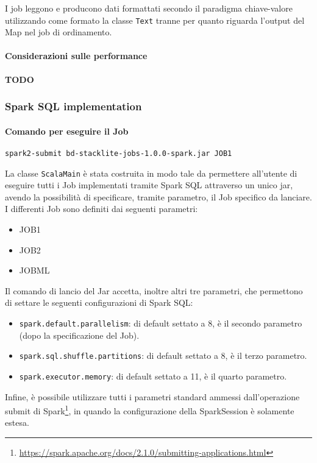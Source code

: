   I job leggono e producono dati formattati secondo il paradigma chiave-valore utilizzando come formato la classe \texttt{Text} tranne per quanto riguarda l'output del Map nel job di ordinamento.

  \paragraph{Considerazioni sulle performance}\label{par:job1:mapreduce:performance}

  \textbf{TODO}

  \subsubsection{Spark SQL implementation}\label{subsub:job1:spark}

  \paragraph{Comando per eseguire il Job}\label{par:job1:spark:cmd}

  \texttt{spark2-submit bd-stacklite-jobs-1.0.0-spark.jar JOB1}

  La classe \texttt{ScalaMain} è stata costruita in modo tale da permettere all'utente di eseguire tutti i Job implementati tramite
  Spark SQL attraverso un unico jar, avendo la possibilità di specificare, tramite parametro, il Job specifico da lanciare.
  I differenti Job sono definiti dai seguenti parametri:
  \begin{itemize}
    \item JOB1
    \item JOB2
    \item JOBML
  \end{itemize}

  Il comando di lancio del Jar accetta, inoltre altri tre parametri, che permettono di settare le seguenti configurazioni di Spark SQL\@:
  \begin{itemize}
    \item \texttt{spark.default.parallelism}: di default settato a 8, è il secondo parametro (dopo la specificazione del Job).
    \item \texttt{spark.sql.shuffle.partitions}: di default settato a 8, è il terzo parametro.
    \item \texttt{spark.executor.memory}: di default settato a 11, è il quarto parametro.
  \end{itemize}

  Infine, è possibile utilizzare tutti i parametri standard ammessi dall'operazione submit di Spark\footnote{\url{https://spark.apache.org/docs/2.1.0/submitting-applications.html}},
  in quando la configurazione della SparkSession è solamente estesa.


